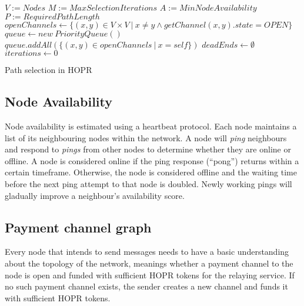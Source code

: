 \begin{algorithm}[H]
    \SetAlgoNoLine
    \DontPrintSemicolon
    $V := Nodes$\;
    $M := MaxSelectionIterations$\;
    $A := MinNodeAvailability$\;
    $P := RequiredPathLength$\;
    \;
    $openChannels \leftarrow \{ (x, y) \in V \times V \ | \ x \ne y \land getChannel(x,y).state = OPEN \}$\;
    $queue \leftarrow new \ PriorityQueue()$\;
    $queue.addAll(\{ (x,y) \in openChannels \ | \ x = self \})$\;
    $deadEnds \leftarrow \emptyset$\;
    $iterations \leftarrow 0$\;
    \;
    \Return{$\bot$}
    \caption{Path selection in HOPR}
\end{algorithm}

\subsection{Node Availability}
\label{sec:nodeavailability}

Node availability is estimated using a heartbeat protocol. Each node maintains a
list of its neighbouring nodes within the network. A node will \textit{ping} neighbours and
respond to \textit{pings} from other nodes to determine whether they are online or offline.
A node is considered online if the ping response (``pong”) returns within a
certain timeframe. Otherwise, the node is considered offline and the waiting
time before the next ping attempt to that node is doubled. Newly working pings will gladually improve a
neighbour's availability score.

\subsection{Payment channel graph}

Every node that intends to send messages needs to have a basic understanding
about the topology of the network, meanings whether a payment channel to the node is open and
funded with sufficient HOPR tokens for the relaying service. If no such
payment channel exists, the sender creates a new channel and funds it with
sufficient HOPR tokens.

